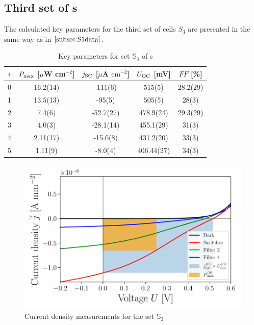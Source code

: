 \documentclass[a4paper,10pt,twocolumn]{article}
\begin{document}
\begin{extract*}
\subsection{Third set of \BHSC s}

The calculated key parameters for the third set of cells $S_3$ are presented in the same way as in $\ref{subsec:S1data}$.

\begin{table}[h]\centering
	\caption{Key parameters for set $\mathbb{S}_3$ of \BHSC s}
	\label{tab:keyparams3}
	\begin{tabular}{@{}ccccc@{}}\toprule
		$i$ & $P_{\text{max}}$ [$\mu$W cm$^{-2}$] & $j_{\text{SC}}$ [$\mu$A $\mathrm{cm}^{-2}$] & $U_{\text{OC}}$ [mV] & $FF$ [\%]\\\midrule
		0 &   16.2(14)  &  -111(6)  & 515(5) & 28.2(29) \\
		1 &   13.5(13)  &  -95(5)  & 505(5) & 28(3) \\
		2 &   7.4(6)  &  -52.7(27)  & 478.9(24) & 29.3(29) \\
		3 &   4.0(3)  &  -28.1(14)  & 455.1(29) & 31(3) \\
		4 &   2.11(17)  &  -15.0(8)  & 431.2(20) & 33(3)\\
		5 &  1.11(9)  &  -8.0(4)  & 406.44(27) & 34(3) \\\bottomrule
	\end{tabular}
\end{table}

\begin{figure}[h]\centering
	\includegraphics[width=\columnwidth]{../../../IV-Curve-Analysis/OSC2Graph.pdf}
	\caption{Current density measurements for the set $\mathbb{S}_3$}
	\label{fig:OSC3Graph}
\end{figure}


\end{extract*}
\end{document}
